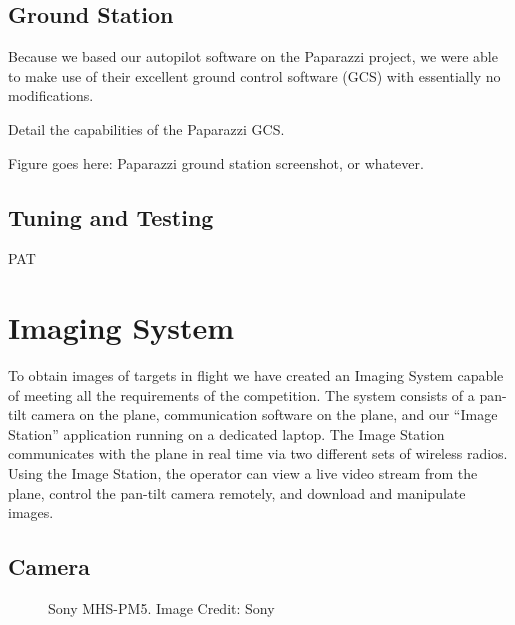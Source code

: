 \documentclass[10pt]{report}
\begin{document}
\subsection{Ground Station}
Because we based our autopilot software on the Paparazzi project, we were able to make use of their excellent ground control software (GCS) with essentially no modifications.

Detail the capabilities of the Paparazzi GCS.

Figure goes here: Paparazzi ground station screenshot, or whatever. 
\subsection{Tuning and Testing}
PAT

\section{Imaging System}

To obtain images of targets in flight we have created an Imaging System capable of meeting all the requirements of the competition.  The system consists of a pan-tilt camera on the plane, communication software on the plane, and our ``Image Station'' application running on a dedicated laptop.  The Image Station communicates with the plane in real time via two different sets of wireless radios.  Using the Image Station, the operator can view a live video stream from the plane, control the pan-tilt camera remotely, and download and manipulate images.

\subsection{Camera}
\begin{figure}
	\centering
	\caption{Sony MHS-PM5. Image Credit: Sony}
	\label{fig:camera}
\end{figure}
\end{document}
